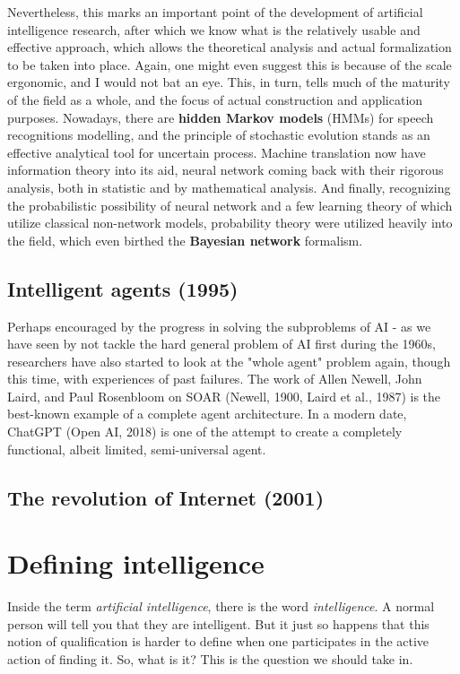 Nevertheless, this marks an important point of the development of artificial intelligence research, after which we know what is the relatively usable and effective approach, which allows the theoretical analysis and actual formalization to be taken into place. Again, one might even suggest this is because of the scale ergonomic, and I would not bat an eye. This, in turn, tells much of the maturity of the field as a whole, and the focus of actual construction and application purposes. Nowadays, there are \textbf{hidden Markov models} (HMMs) for speech recognitions modelling, and the principle of stochastic evolution stands as an effective analytical tool for uncertain process. Machine translation now have information theory into its aid, neural network coming back with their rigorous analysis, both in statistic and by mathematical analysis. And finally, recognizing the probabilistic possibility of neural network and a few learning theory of which utilize classical non-network models, probability theory were utilized heavily into the field, which even birthed the \textbf{Bayesian network} formalism. 

\subsection{Intelligent agents (1995)}

Perhaps encouraged by the progress in solving the subproblems of AI - as we have seen by not tackle the hard general problem of AI first during the 1960s, researchers have also started to look at the "whole agent" problem again, though this time, with experiences of past failures. The work of Allen Newell, John Laird, and Paul Rosenbloom on \textsf{SOAR} (Newell, 1900, Laird et al., 1987) is the best-known example of a complete agent architecture. In a modern date, ChatGPT (Open AI, 2018) is one of the attempt to create a completely functional, albeit limited, semi-universal agent. 
\subsection{The revolution of Internet (2001)}



\section{Defining intelligence}

Inside the term \textit{artificial intelligence}, there is the word \textit{intelligence}. A normal person will tell you that they are intelligent. But it just so happens that this notion of qualification is harder to define when one participates in the active action of finding it. So, what is it? This is the question we should take in. 

